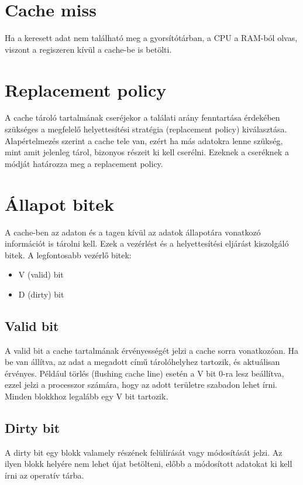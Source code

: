 \section{Cache miss}
Ha a keresett adat nem található meg a gyorsítótárban, a CPU a RAM-ból olvas, viszont a regiszeren kívül a cache-be is betölti.

\section{Replacement policy}
A cache tároló tartalmának cseréjekor a találati arány fenntartása érdekében szükséges a megfelelő helyettesítési stratégia (replacement policy) kiválasztása.
Alapértelmezés szerint a cache tele van, ezért ha más adatokra lenne szükség, mint amit jelenleg tárol, bizonyos részeit ki kell cserélni.
Ezeknek a cseréknek a módját határozza meg a replacement policy.

\section{Állapot bitek}
A cache-ben az adaton és a tagen kívül az adatok állapotára vonatkozó információt is tárolni kell.
Ezek a vezérlést és a helyettesítési eljárást kiszolgáló bitek.
A legfontosabb vezérlő bitek:
\begin{itemize}
    \item V (valid) bit
    \item D (dirty) bit
\end{itemize}

\subsection{Valid bit}
A valid bit a cache tartalmának érvényességét jelzi a cache sorra vonatkozóan.
Ha be van állítva, az adat a megadott című tárolóhelyhez tartozik, és aktuálisan érvényes.
Például törlés (flushing cache line) esetén a V bit 0-ra lesz beállítva, ezzel jelzi a processzor számára, hogy az adott területre szabadon lehet írni.
Minden blokkhoz legalább egy V bit tartozik.

\subsection{Dirty bit}
A dirty bit egy blokk valamely részének felülírását vagy módosítását jelzi.
Az ilyen blokk helyére nem lehet újat betölteni, előbb a módosított adatokat ki kell írni az operatív tárba.

